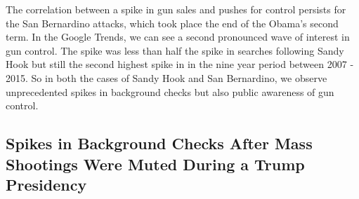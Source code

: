 \documentclass[9pt,twocolumn,twoside,lineno]{pnas-new}
\begin{document}
	The correlation between a spike in gun sales and pushes for control persists for the San Bernardino attacks, which took place the end of the Obama’s second term. In the Google Trends, we can see a second pronounced wave of interest in gun control. The spike was less than half the spike in searches following Sandy Hook but still the second highest spike in in the nine year period between 2007 - 2015. So in both the cases of Sandy Hook and San Bernardino, we observe unprecedented spikes in background checks but also public awareness of gun control. 

\subsection*{Spikes in Background Checks After Mass Shootings Were Muted During a Trump Presidency}
\end{document}
